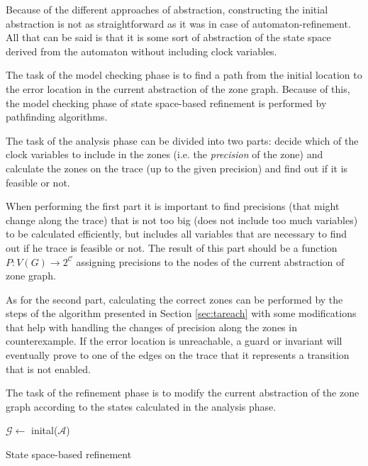 Because of the different approaches of abstraction, constructing the initial abstraction is not as straightforward as it was in case of automaton-refinement. All that can be said is that it is some sort of abstraction of the state space derived from the automaton without including clock variables.

The task of the model checking phase is to find a path from the initial location to the error location in the current abstraction of the zone graph. Because of this, the model checking phase of state space-based refinement is performed by pathfinding algorithms.

The task of the analysis phase can be divided into two parts:  decide which of the clock variables to include in the zones (i.e. the \emph{precision} of the zone) and calculate the zones on the trace (up to the given precision) and find out if it is feasible or not. 

When performing the first part it is important to find precisions (that might change along the trace) that is not too big (does not include too much variables) to be calculated efficiently, but includes all variables that are necessary to find out if he trace is feasible or not. The result of this part should be a function $P: V(G) \to 2^\mathcal{C}$ assigning precisions to the nodes of the current abstraction of zone graph.

As for the second part, calculating the correct zones can be performed by the steps of the algorithm presented in Section \ref{sec:tareach} with some modifications that help with handling the changes of precision along the zones in counterexample. If the error location is unreachable, a guard or invariant will eventually prove to one of the edges on the trace that it represents a transition that is not enabled.

The task of the refinement phase is to modify the current abstraction of the zone graph according to the states calculated in the analysis phase.

\begin{algorithm}
	\BlankLine
	$\mathcal{G} \leftarrow$ inital($\mathcal{A}$) 
	\caption{State space-based refinement} \label{alg:cerarssp}
\end{algorithm}

